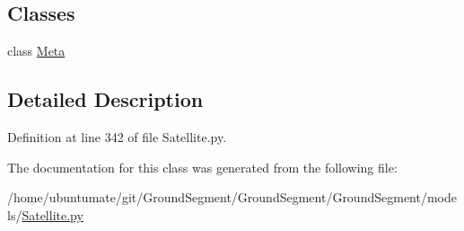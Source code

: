 \subsection*{Classes}
\begin{DoxyCompactItemize}
\item 
class \hyperlink{class_ground_segment_1_1models_1_1_satellite_1_1_form_view_sat_1_1_meta}{Meta}
\end{DoxyCompactItemize}


\subsection{Detailed Description}


Definition at line 342 of file Satellite.\+py.



The documentation for this class was generated from the following file\+:\begin{DoxyCompactItemize}
\item 
/home/ubuntumate/git/\+Ground\+Segment/\+Ground\+Segment/\+Ground\+Segment/models/\hyperlink{_satellite_8py}{Satellite.\+py}\end{DoxyCompactItemize}
